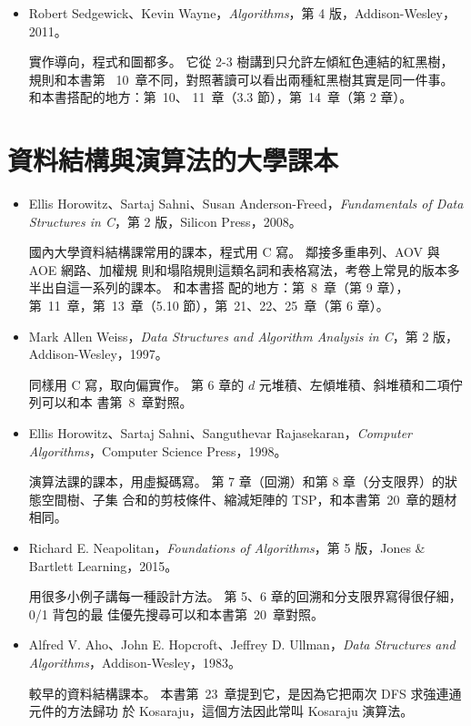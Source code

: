 \begin{itemize}
\item Robert Sedgewick、Kevin Wayne，\textit{Algorithms}，第 4 版，Addison-Wesley，
2011。

實作導向，程式和圖都多。 它從 2-3 樹講到只允許左傾紅色連結的紅黑樹，規則和本書第~
10~章不同，對照著讀可以看出兩種紅黑樹其實是同一件事。 和本書搭配的地方：第~10、
11~章（3.3 節），第~14~章（第 2 章）。
\end{itemize}

\section*{資料結構與演算法的大學課本}

\begin{itemize}
\item Ellis Horowitz、Sartaj Sahni、Susan Anderson-Freed，\textit{Fundamentals of
Data Structures in C}，第 2 版，Silicon Press，2008。

國內大學資料結構課常用的課本，程式用 C 寫。 鄰接多重串列、AOV 與 AOE 網路、加權規
則和塌陷規則這類名詞和表格寫法，考卷上常見的版本多半出自這一系列的課本。 和本書搭
配的地方：第~8~章（第 9 章），第~11~章，第~13~章（5.10 節），第~21、22、25~章（第 6 章）。

\item Mark Allen Weiss，\textit{Data Structures and Algorithm Analysis in C}，第 2
版，Addison-Wesley，1997。

同樣用 C 寫，取向偏實作。 第 6 章的 $d$ 元堆積、左傾堆積、斜堆積和二項佇列可以和本
書第~8~章對照。

\item Ellis Horowitz、Sartaj Sahni、Sanguthevar Rajasekaran，\textit{Computer
Algorithms}，Computer Science Press，1998。

演算法課的課本，用虛擬碼寫。 第 7 章（回溯）和第 8 章（分支限界）的狀態空間樹、子集
合和的剪枝條件、縮減矩陣的 TSP，和本書第~20~章的題材相同。

\item Richard E. Neapolitan，\textit{Foundations of Algorithms}，第 5 版，Jones \&
Bartlett Learning，2015。

用很多小例子講每一種設計方法。 第 5、6 章的回溯和分支限界寫得很仔細，0/1 背包的最
佳優先搜尋可以和本書第~20~章對照。

\item Alfred V. Aho、John E. Hopcroft、Jeffrey D. Ullman，\textit{Data Structures
and Algorithms}，Addison-Wesley，1983。

較早的資料結構課本。 本書第~23~章提到它，是因為它把兩次 DFS 求強連通元件的方法歸功
於 Kosaraju，這個方法因此常叫 Kosaraju 演算法。
\end{itemize}

